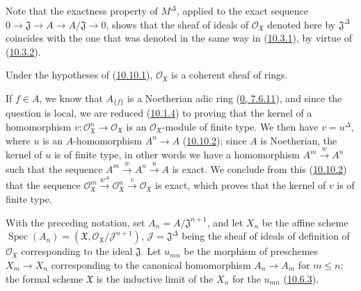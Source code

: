 Note that the exactness property of $M^\Delta$, applied to the exact
sequence
$0\to\mathfrak{J}\to A\to A/\mathfrak{J}\to0$, shows that the sheaf
of ideals of $\mathscr{O}_{\mathfrak{X}}$ denoted here by
$\mathfrak{J}^\Delta$ coincides with the one that was denoted in the same
way in (\hyperref[I.10.3.1]{10.3.1}), by virtue of
(\hyperref[I.10.3.2]{10.3.2}).

\begin{proposition}[10.10.3]
\label{I.10.10.3}
Under the hypotheses of (\hyperref[I.10.10.1]{10.10.1}),
$\mathscr{O}_{\mathfrak{X}}$ is a coherent sheaf of rings.
\end{proposition}

If $f\in A$, we know that $A_{\{f\}}$ is a Noetherian adic ring
(\hyperref[0.7.6.11]{0, 7.6.11}), and since the question is local,
we are reduced (\hyperref[I.10.1.4]{10.1.4}) to proving that the
kernel of a homomorphism
$v:\mathscr{O}_{\mathfrak{X}}^n\to\mathscr{O}_{\mathfrak{X}}$ is an
$\mathscr{O}_{\mathfrak{X}}$-module of finite type. We then have
$v=u^\Delta$, where $u$ is an $A$-homomorphism $A^n\to A$
(\hyperref[I.10.10.2]{10.10.2}); since $A$ is Noetherian, the kernel
of $u$ is of finite type, in other words we have a homomorphism
$A^m\xrightarrow{w}A^n$ such that the sequence
$A^m\xrightarrow{w}A^n\xrightarrow{u}A$ is exact. We conclude from this
(\hyperref[I.10.10.2]{10.10.2}) that the sequence
$\mathscr{O}_{\mathfrak{X}}^m\xrightarrow{w^\Delta}
\mathscr{O}_{\mathfrak{X}}^n\xrightarrow{v}
\mathscr{O}_{\mathfrak{X}}$ is exact, which proves that the kernel of
$v$ is of finite type.

\begin{env}[10.10.4]
\label{I.10.10.4}
With the preceding notation, set
$A_n=A/\mathfrak{J}^{n+1}$, and let $X_n$ be the affine scheme
$\operatorname{Spec}(A_n)=(\mathfrak{X},
\mathscr{O}_{\mathfrak{X}}/\mathscr{J}^{n+1})$,
$\mathscr{J}=\mathfrak{J}^\Delta$ being the sheaf of ideals of
definition of $\mathscr{O}_{\mathfrak{X}}$ corresponding to the ideal
$\mathfrak{J}$. Let $u_{mn}$ be the morphism of preschemes
$X_m\to X_n$ corresponding to the canonical homomorphism
$A_n\to A_m$ for $m\leq n$; the formal scheme $\mathfrak{X}$ is the
inductive limit of the $X_n$ for the $u_{mn}$
(\hyperref[I.10.6.3]{10.6.3}).
\end{env}


